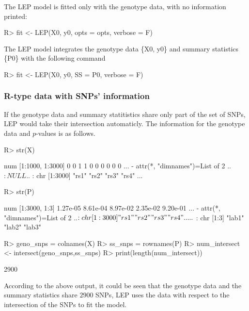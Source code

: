 \documentclass[11pt]{article}
\begin{document}
The LEP model is fitted only with the genotype data, with no information printed:
\begin{Schunk}
\begin{Sinput}
R> fit <- LEP(X0, y0, opts = opts, verbose = F)
\end{Sinput}
\end{Schunk}

The LEP model integrates the genotype data \{X0, y0\} and summary statistics \{P0\} with the following command
\begin{Schunk}
\begin{Sinput}
R> fit <- LEP(X0, y0, SS = P0, verbose = F)
\end{Sinput}
\end{Schunk}



\subsubsection{R-type data with SNPs' information}
If the genotype data and summary statitistics share only part of the set of SNPs, LEP would take their intersection automaticly. The information for the genotype data and $p$-values is as follows.
\begin{Schunk}
\begin{Sinput}
R> str(X)
\end{Sinput}
\begin{Soutput}
 num [1:1000, 1:3000] 0 0 1 1 0 0 0 0 0 0 ...
 - attr(*, "dimnames")=List of 2
  ..$ : NULL
  ..$ : chr [1:3000] "rs1" "rs2" "rs3" "rs4" ...
\end{Soutput}
\begin{Sinput}
R> str(P)
\end{Sinput}
\begin{Soutput}
 num [1:3000, 1:3] 1.27e-05 8.61e-04 8.97e-02 2.35e-02 9.20e-01 ...
 - attr(*, "dimnames")=List of 2
  ..$ : chr [1:3000] "rs1" "rs2" "rs3" "rs4" ...
  ..$ : chr [1:3] "lab1" "lab2" "lab3"
\end{Soutput}
\begin{Sinput}
R> geno_snps = colnames(X)
R> ss_snps = rownames(P)
R> num_intersect <- intersect(geno_snps,ss_snps)
R> print(length(num_intersect))
\end{Sinput}
\begin{Soutput}
[1] 2900
\end{Soutput}
\end{Schunk}
According to the above output, it could be seen that the genotype data and the summary statistics share $2900$ SNPs, LEP uses the data with respect to the intersection of the SNPs to fit the model.
\end{document}
